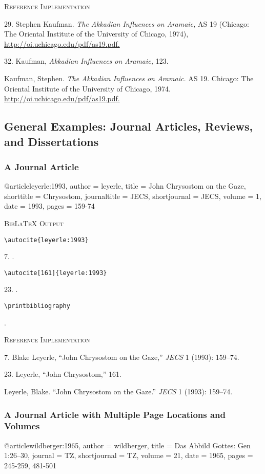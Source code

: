 \documentclass[a4paper]{article}
\newcommand\citetestnpf[4]{%
  {\textsc{BibLaTeX Output}\par
   \nobreak
   \texttt{\textbackslash autocite\{#4\}}\par
   \color{biblatex-colour}
   #1. \cite{#4}.\par
   \color{black}
   \texttt{\textbackslash autocite[#3]\{#4\}}\par
   \color{biblatex-colour}
   #2. \cite[#3]{#4}.\par
   \color{black}
   \texttt{\textbackslash printbibliography}\par
   \color{biblatex-colour}
   \hangindent\bibindent\bibentrycite{#4}.\par}}
\newenvironment{refimp}{%
  \begin{minipage}{\linewidth}
    \setlength{\parskip}{1ex}
    \textsc{Reference Implementation}\par
    \nobreak
    \color{reference-colour}
}{\end{minipage}}
\newenvironment{vb}{%
  \setlength{\parskip}{0pt}
  \verbatim}{\endverbatim}
\begin{document}
\begin{refimp}
  29. Stephen Kaufman. \emph{The Akkadian Influences on Aramaic,} AS 19
  (Chicago: The Oriental Institute of the University of Chicago, 1974),
  \url{http://oi.uchicago.edu/pdf/as19.pdf.}

  32. Kaufman, \emph{Akkadian Influences on Aramaic,} 123.

  \hangindent\bibindent Kaufman, Stephen. \emph{The Akkadian Influences on
  Aramaic.} AS 19. Chicago: The Oriental Institute of the University of
  Chicago, 1974. \url{http://oi.uchicago.edu/pdf/as19.pdf.}
\end{refimp}

\subsection{General Examples: Journal Articles, Reviews, and Dissertations}

\subsubsection{A Journal Article}

\begin{vb}
@article{leyerle:1993,
  author = leyerle,
  title = {John Chrysostom on the Gaze},
  shorttitle = {Chrysostom},
  journaltitle = JECS,
  shortjournal = {JECS},
  volume = {1},
  date = {1993},
  pages = {159-74}
}
\end{vb}  

\citetestnpf{7}{23}{161}{leyerle:1993}

\begin{refimp}
  7. Blake Leyerle, “John Chrysostom on the Gaze,” \emph{JECS} 1 (1993): 159–74.

  23. Leyerle, “John Chrysostom,” 161.

  \hangindent\bibindent Leyerle, Blake. “John Chrysostom on the Gaze.”
  \emph{JECS} 1 (1993): 159–74.
\end{refimp}

\subsubsection{A Journal Article with Multiple Page Locations and Volumes}

\begin{vb}
@article{wildberger:1965,
  author = wildberger,
  title = {Das Abbild Gottes: Gen 1:26–30},
  journal = TZ,
  shortjournal = {TZ},
  volume = {21},
  date = {1965},
  pages = {245-259, 481-501}
}
\end{vb}
\end{document}
